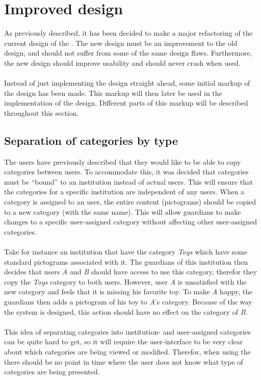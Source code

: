 \section{Improved design}
\label{sec:improved_design}

As previously described, it has been decided to make a major refactoring of the current design of the \ct. The new design must be an improvement to the old design, and should not suffer from some of the same design flaws. Furthermore, the new design should improve usability and should never crash when used.
\\\\
Instead of just implementing the design straight ahead, some initial markup of the design has been made. This markup will then later be used in the implementation of the design. Different parts of this markup will be described throughout this section.

\subsection{Separation of categories by type}
The users have previously described that they would like to be able to copy categories between users. To accommodate this, it was decided that categories must  be ``bound'' to an institution instead of actual users. This will ensure that the categories for a specific institution are independent of any users. When a category is assigned to an user, the entire content (pictograms) should be copied to a new category (with the same name). This will allow guardians to make changes to a specific user-assigned category without affecting other user-assigned categories. 
\\\\
Take for instance an institution that have the category \emph{Toys} which have some standard pictograms associated with it. The guardians of this institution then decides that users \emph{A} and \emph{B} should have access to use this category, therefor they copy the \emph{Toys} category to both users. However, user \emph{A} is unsatisfied with the new category and feels that it is missing his favorite toy. To make \emph{A} happy, the guardians then adds a pictogram of his toy to \emph{A}'s category. Because of the way the system is designed, this action should have no effect on the category of \emph{B}.
\\\\
This idea of separating categories into institution- and user-assigned categories can be quite hard to get, so it will require the user-interface to be very clear about which categories are being viewed or modified. Therefor, when using the \ct there should be no point in time where the user does not know what type of categories are being presented. 

